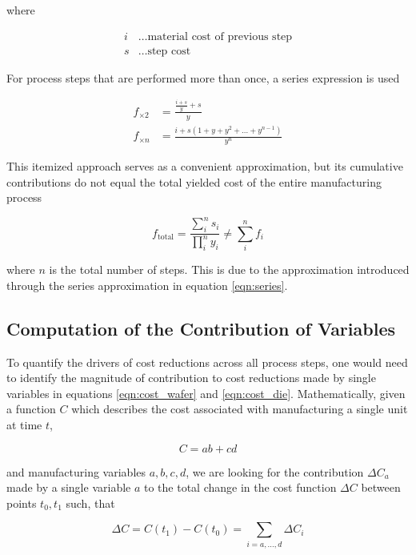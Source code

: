 \documentclass[10pt]{article}
\begin{document}
where

\begin{align*}
    i &\dots \text{material cost of previous step} \\
    s &\dots \text{step cost}
\end{align*}

For process steps that are performed more than once, a series expression is used

\begin{align}
\label{eqn:series}
    f_{\times 2} &=  \frac{\frac{i+s}{y}+s}{y} \\
    f_{\times n} &= \frac{i + s(1+y+y^2+ \dots + y^{n-1})}{y^n}
\end{align}

This itemized approach serves as a convenient approximation, but its cumulative contributions do not equal the total yielded cost of the entire manufacturing process

\begin{equation}
    f_\text{total} = \frac{\sum_i^n s_i}{\prod_i^ny_i} \neq \sum_i^n f_i
\end{equation}

where $n$ is the total number of steps. This is due to the approximation introduced through the series approximation in equation \cref{eqn:series}.

\subsection{Computation of the Contribution of Variables}

To quantify the drivers of cost reductions across all process steps, one would need to identify the magnitude of contribution to cost reductions made by single variables in equations \cref{eqn:cost_wafer} and \cref{eqn:cost_die}. Mathematically, given a function $C$ which describes the cost associated with manufacturing a single unit at time $t$,

\begin{equation}
C=ab+cd
\end{equation}

and manufacturing variables $a,b,c,d$, we are looking for the contribution $\Delta C_{a}$ made by a single variable $a$ to the total change in the cost function $\Delta C$ between points $t_0,t_1$ such, that

\begin{equation}
\Delta C = C(t_1)-C(t_0) = \sum_{i=a, \dots, d} \Delta C_i
\end{equation}
\end{document}
